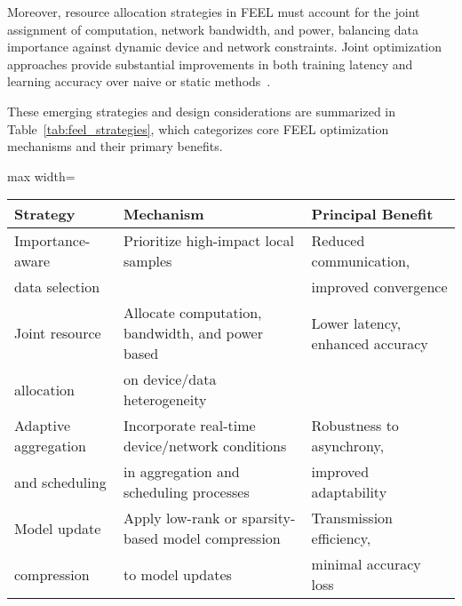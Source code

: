 \documentclass[sigconf]{acmart}
\begin{document}
Moreover, resource allocation strategies in FEEL must account for the joint assignment of computation, network bandwidth, and power, balancing data importance against dynamic device and network constraints. Joint optimization approaches provide substantial improvements in both training latency and learning accuracy over naive or static methods~\cite{ref42}. 

These emerging strategies and design considerations are summarized in Table~\ref{tab:feel_strategies}, which categorizes core FEEL optimization mechanisms and their primary benefits.

\begin{table*}[htbp]
\centering
\caption{Core Optimization Strategies in Federated Edge Learning (FEEL)}
\label{tab:feel_strategies}
\begin{adjustbox}{max width=\textwidth}
\begin{tabular}{lll}
\toprule
\textbf{Strategy}    & \textbf{Mechanism}                                       & \textbf{Principal Benefit}        \\
\midrule
Importance-aware     & Prioritize high-impact local samples                     & Reduced communication,           \\
data selection       &                                                         & improved convergence             \\
Joint resource       & Allocate computation, bandwidth, and power based         & Lower latency, enhanced accuracy \\
allocation           & on device/data heterogeneity                            &                                  \\
Adaptive aggregation & Incorporate real-time device/network conditions          & Robustness to asynchrony,        \\
and scheduling       & in aggregation and scheduling processes                  & improved adaptability            \\
Model update         & Apply low-rank or sparsity-based model compression       & Transmission efficiency,         \\
compression          & to model updates                                        & minimal accuracy loss            \\
\bottomrule
\end{tabular}
\end{adjustbox}
\end{table*}
\end{document}
